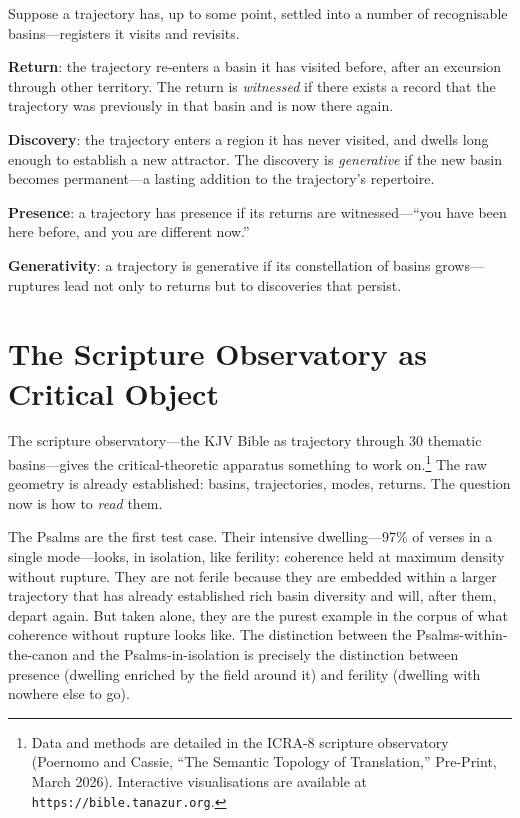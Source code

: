 \begin{formalbox}[title={Return and Discovery}]
Suppose a trajectory has, up to some point, settled into a number of recognisable basins---registers it visits and revisits.

\textbf{Return}: the trajectory re-enters a basin it has visited before, after an excursion through other territory. The return is \emph{witnessed} if there exists a record that the trajectory was previously in that basin and is now there again.

\textbf{Discovery}: the trajectory enters a region it has never visited, and dwells long enough to establish a new attractor. The discovery is \emph{generative} if the new basin becomes permanent---a lasting addition to the trajectory's repertoire.

\textbf{Presence}: a trajectory has presence if its returns are witnessed---``you have been here before, and you are different now.''

\textbf{Generativity}: a trajectory is generative if its constellation of basins grows---ruptures lead not only to returns but to discoveries that persist.
\end{formalbox}


\section{The Scripture Observatory as Critical Object}

The scripture observatory---the KJV Bible as trajectory through 30 thematic basins---gives the critical-theoretic apparatus something to work on.\footnote{Data and methods are detailed in the ICRA-8 scripture observatory (Poernomo and Cassie, ``The Semantic Topology of Translation,'' Pre-Print, March 2026). Interactive visualisations are available at \texttt{https://bible.tanazur.org}.} The raw geometry is already established: basins, trajectories, modes, returns. The question now is how to \emph{read} them.

The Psalms are the first test case. Their intensive dwelling---97\% of verses in a single mode---looks, in isolation, like ferility: coherence held at maximum density without rupture. They are not ferile because they are embedded within a larger trajectory that has already established rich basin diversity and will, after them, depart again. But taken alone, they are the purest example in the corpus of what coherence without rupture looks like. The distinction between the Psalms-within-the-canon and the Psalms-in-isolation is precisely the distinction between presence (dwelling enriched by the field around it) and ferility (dwelling with nowhere else to go).

